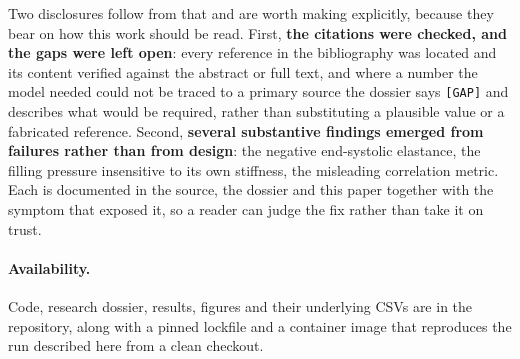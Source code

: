 \documentclass[11pt,a4paper]{article}
\begin{document}
Two disclosures follow from that and are worth making explicitly, because they bear on how
this work should be read. First, \textbf{the citations were checked, and the gaps were left
open}: every reference in the bibliography was located and its content verified against the
abstract or full text, and where a number the model needed could not be traced to a primary
source the dossier says \texttt{[GAP]} and describes what would be required, rather than
substituting a plausible value or a fabricated reference. Second, \textbf{several substantive
findings emerged from failures rather than from design}: the negative end-systolic
elastance, the filling pressure insensitive to its own stiffness, the misleading correlation
metric. Each is documented in the source, the dossier and this paper together with the
symptom that exposed it, so a reader can judge the fix rather than take it on trust.

\paragraph{Availability.} Code, research dossier, results, figures and their underlying CSVs
are in the repository, along with a pinned lockfile and a container image that reproduces the
run described here from a clean checkout.
\end{document}
